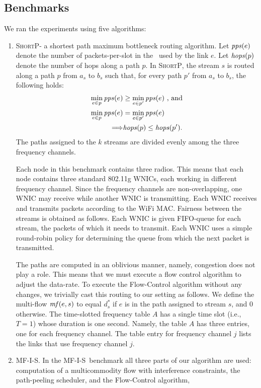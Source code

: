\documentclass[12pt]{article}
\newenvironment{proof sketch}[1]{\noindent {\emph{Proof sketch of #1:}}}{\hfill \qed}
\newcommand{\pps}{\text{\emph{pps}}}
\newcommand{\hops}{\text{\emph{hops}}}
\newcommand{\mf}{\text{\emph{mf}}}
\newcommand{\MCS}{\text{\sc{mcs}}}
\newcommand{\algA}{\textsc{MF-I-S}}
\newcommand{\algB}{\textsc{ShortP}}
\newcommand{\algS}{\algB}
\begin{document}
\subsection{Benchmarks}
We ran the experiments using five algorithms:
\begin{enumerate}
\item \algS - a shortest path maximum bottleneck routing algorithm.
  Let $\pps(e)$ denote the number of packets-per-slot in the
  \MCS\ used by the link $e$.  Let $\hops(p)$ denote the number of
  hops along a path $p$. In \algS, the stream $s$ is routed along a
  path $p$ from $a_s$ to $b_s$ such that, for every path $p'$ from
  $a_s$ to $b_s$, the following holds:
  \begin{align*}
    \min_{e \in p} \pps(e) &\geq \min_{e \in p'} \pps(e) \text{ , and}\\
    \min_{e \in p} \pps(e) &= \min_{e \in p'} \pps(e)  \\
\Longrightarrow &\hops(p) \leq \hops(p').
  \end{align*}
  The paths assigned to the $k$ streams are divided evenly among the
  three frequency channels.

Each node in this benchmark contains three
  radios. This means that each node contains three standard 802.11g
  WNICs, each working in different frequency channel.  Since the
  frequency channels are non-overlapping, one WNIC may receive while
  another WNIC is transmitting.  Each WNIC receives and transmits
  packets according to the WiFi MAC.  Fairness between the streams is
  obtained as follows.  Each WNIC is given FIFO-queue for each stream,
  the packets of which it needs to transmit. Each WNIC uses a simple
  round-robin policy for determining the queue from which the next
  packet is transmitted.

  The paths are computed in an oblivious manner, namely, congestion
  does not play a role. This means that we must execute a flow control
  algorithm to adjust the data-rate.  To execute the Flow-Control
  algorithm without any changes, we trivially cast this routing to our
  setting as follows.  We define the multi-flow $\mf(e,s)$ to equal
  $d^*_s$ if $e$ is in the path assigned to stream $s$, and $0$
  otherwise. The time-slotted frequency table $A$ has a single time
  slot (i.e., $T=1$) whose duration is one second. Namely, the table
  $A$ has three entries, one for each frequency channel.  The table
  entry for frequency channel $j$ lists the links that use frequency
  channel $j$.
\item \algA. In the \algA\ benchmark all three parts of our algorithm
  are used: computation of a multicommodity flow with interference
  constraints, the path-peeling scheduler, and the Flow-Control
  algorithm,


\end{enumerate}
\end{document}

